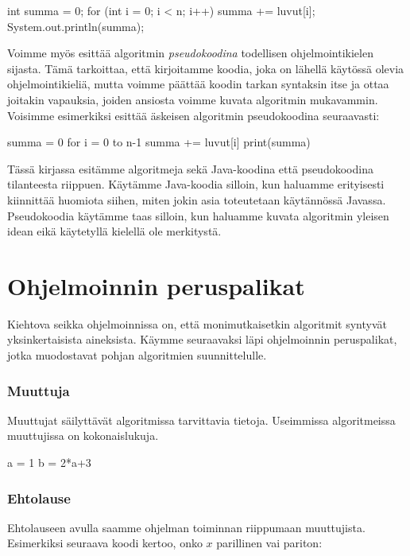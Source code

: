 \begin{code}
int summa = 0;
for (int i = 0; i < n; i++) {
    summa += luvut[i];
}
System.out.println(summa);
\end{code}


Voimme myös esittää algoritmin \emph{pseudokoodina}
todellisen ohjelmointikielen sijasta.
Tämä tarkoittaa, että kirjoitamme koodia,
joka on lähellä käytössä olevia ohjelmointikieliä, mutta voimme
päättää koodin tarkan syntaksin itse ja ottaa joitakin vapauksia,
joiden ansiosta voimme kuvata algoritmin mukavammin.
Voisimme esimerkiksi esittää äskeisen algoritmin pseudokoodina seuraavasti:

\begin{code}
summa = 0
for i = 0 to n-1
    summa += luvut[i]
print(summa)
\end{code}

Tässä kirjassa esitämme algoritmeja sekä Java-koodina että pseudokoodina
tilanteesta riippuen.
Käytämme Java-koodia silloin, kun haluamme erityisesti kiinnittää huomiota siihen,
miten jokin asia toteutetaan käytännössä Javassa.
Pseudokoodia käytämme taas silloin, kun haluamme kuvata algoritmin yleisen
idean eikä käytetyllä kielellä ole merkitystä.

\section{Ohjelmoinnin peruspalikat}

Kiehtova seikka ohjelmoinnissa on, että monimutkaisetkin algoritmit
syntyvät yksinkertaisista aineksista.
Käymme seuraavaksi läpi ohjelmoinnin peruspalikat,
jotka muodostavat pohjan algoritmien suunnittelulle.

\subsubsection{Muuttuja}

Muuttujat säilyttävät algoritmissa tarvittavia tietoja.
Useimmissa algoritmeissa muuttujissa on kokonaislukuja.

\begin{code}
a = 1
b = 2*a+3
\end{code}

\subsubsection{Ehtolause}

Ehtolauseen avulla saamme ohjelman toiminnan
riippumaan muuttujista.
Esimerkiksi seuraava koodi kertoo, onko $x$ parillinen vai pariton:

